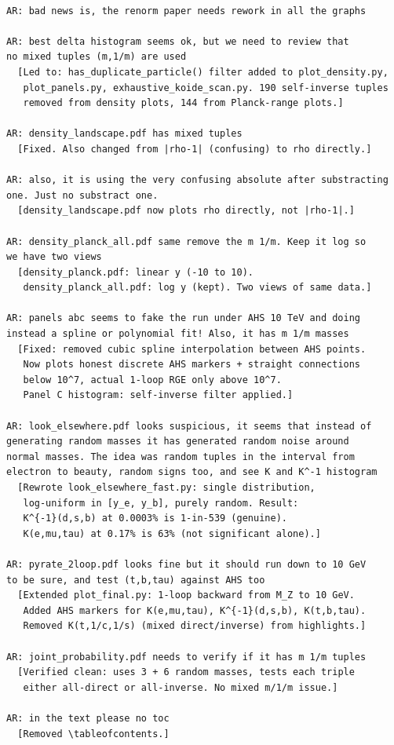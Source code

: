 \documentclass[11pt,a4paper]{article}
\begin{document}
\begin{Verbatim}[fontsize=\footnotesize]
% === SESSION 2: Figure fixes (2026-03-10) ===

AR: bad news is, the renorm paper needs rework in all the graphs

AR: best delta histogram seems ok, but we need to review that
no mixed tuples (m,1/m) are used
  [Led to: has_duplicate_particle() filter added to plot_density.py,
   plot_panels.py, exhaustive_koide_scan.py. 190 self-inverse tuples
   removed from density plots, 144 from Planck-range plots.]

AR: density_landscape.pdf has mixed tuples
  [Fixed. Also changed from |rho-1| (confusing) to rho directly.]

AR: also, it is using the very confusing absolute after substracting
one. Just no substract one.
  [density_landscape.pdf now plots rho directly, not |rho-1|.]

AR: density_planck_all.pdf same remove the m 1/m. Keep it log so
we have two views
  [density_planck.pdf: linear y (-10 to 10).
   density_planck_all.pdf: log y (kept). Two views of same data.]

AR: panels abc seems to fake the run under AHS 10 TeV and doing
instead a spline or polynomial fit! Also, it has m 1/m masses
  [Fixed: removed cubic spline interpolation between AHS points.
   Now plots honest discrete AHS markers + straight connections
   below 10^7, actual 1-loop RGE only above 10^7.
   Panel C histogram: self-inverse filter applied.]

AR: look_elsewhere.pdf looks suspicious, it seems that instead of
generating random masses it has generated random noise around
normal masses. The idea was random tuples in the interval from
electron to beauty, random signs too, and see K and K^-1 histogram
  [Rewrote look_elsewhere_fast.py: single distribution,
   log-uniform in [y_e, y_b], purely random. Result:
   K^{-1}(d,s,b) at 0.0003% is 1-in-539 (genuine).
   K(e,mu,tau) at 0.17% is 63% (not significant alone).]

AR: pyrate_2loop.pdf looks fine but it should run down to 10 GeV
to be sure, and test (t,b,tau) against AHS too
  [Extended plot_final.py: 1-loop backward from M_Z to 10 GeV.
   Added AHS markers for K(e,mu,tau), K^{-1}(d,s,b), K(t,b,tau).
   Removed K(t,1/c,1/s) (mixed direct/inverse) from highlights.]

AR: joint_probability.pdf needs to verify if it has m 1/m tuples
  [Verified clean: uses 3 + 6 random masses, tests each triple
   either all-direct or all-inverse. No mixed m/1/m issue.]

AR: in the text please no toc
  [Removed \tableofcontents.]
\end{Verbatim}
\end{document}
